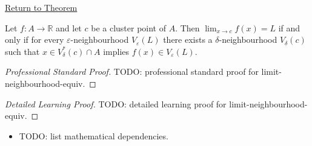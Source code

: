 \newpage
{}
\label{prf:limit-neighbourhood-equiv}

\begin{remark*}[Return]
\hyperref[prop:limit-neighbourhood-equiv]{Return to Theorem}
\end{remark*}

\begin{theorem*}
Let $f : A \to \mathbb{R}$ and let $c$ be a cluster point of $A$.
Then $\lim_{x\to c}f(x)=L$ if and only if for every
$\varepsilon$-neighbourhood $V_\varepsilon(L)$ there exists a
$\delta$-neighbourhood $V_\delta(c)$ such that
$x\in V_\delta^*(c)\cap A$ implies $f(x)\in V_\varepsilon(L)$.

\smallskip\noindent
\end{theorem*}

\begin{proof}[Professional Standard Proof]
\LRAProofBodyStart
TODO: professional standard proof for limit-neighbourhood-equiv.
\end{proof}

\begin{proof}[Detailed Learning Proof]
\LRAProofBodyStart
TODO: detailed learning proof for limit-neighbourhood-equiv.
\end{proof}

\begin{remark*}
\end{remark*}

\begin{dependencies}
\begin{itemize}
  \item TODO: list mathematical dependencies.
\end{itemize}
\end{dependencies}

\clearpage
